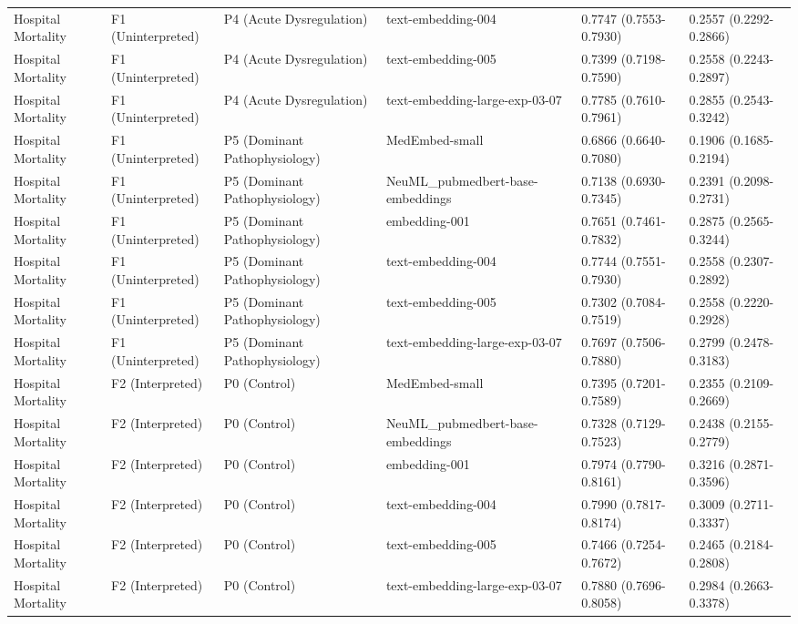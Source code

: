 \documentclass[border=0pt]{standalone}
\begin{document}
\begin{adjustbox}{width=\textwidth}
\begin{tabular}{llllll}
Hospital Mortality & F1 (Uninterpreted) & P4 (Acute Dysregulation) & text-embedding-004 & 0.7747 (0.7553-0.7930) & 0.2557 (0.2292-0.2866) \\
Hospital Mortality & F1 (Uninterpreted) & P4 (Acute Dysregulation) & text-embedding-005 & 0.7399 (0.7198-0.7590) & 0.2558 (0.2243-0.2897) \\
Hospital Mortality & F1 (Uninterpreted) & P4 (Acute Dysregulation) & text-embedding-large-exp-03-07 & 0.7785 (0.7610-0.7961) & 0.2855 (0.2543-0.3242) \\
Hospital Mortality & F1 (Uninterpreted) & P5 (Dominant Pathophysiology) & MedEmbed-small & 0.6866 (0.6640-0.7080) & 0.1906 (0.1685-0.2194) \\
Hospital Mortality & F1 (Uninterpreted) & P5 (Dominant Pathophysiology) & NeuML\_pubmedbert-base-embeddings & 0.7138 (0.6930-0.7345) & 0.2391 (0.2098-0.2731) \\
Hospital Mortality & F1 (Uninterpreted) & P5 (Dominant Pathophysiology) & embedding-001 & 0.7651 (0.7461-0.7832) & 0.2875 (0.2565-0.3244) \\
Hospital Mortality & F1 (Uninterpreted) & P5 (Dominant Pathophysiology) & text-embedding-004 & 0.7744 (0.7551-0.7930) & 0.2558 (0.2307-0.2892) \\
Hospital Mortality & F1 (Uninterpreted) & P5 (Dominant Pathophysiology) & text-embedding-005 & 0.7302 (0.7084-0.7519) & 0.2558 (0.2220-0.2928) \\
Hospital Mortality & F1 (Uninterpreted) & P5 (Dominant Pathophysiology) & text-embedding-large-exp-03-07 & 0.7697 (0.7506-0.7880) & 0.2799 (0.2478-0.3183) \\
Hospital Mortality & F2 (Interpreted) & P0 (Control) & MedEmbed-small & 0.7395 (0.7201-0.7589) & 0.2355 (0.2109-0.2669) \\
Hospital Mortality & F2 (Interpreted) & P0 (Control) & NeuML\_pubmedbert-base-embeddings & 0.7328 (0.7129-0.7523) & 0.2438 (0.2155-0.2779) \\
Hospital Mortality & F2 (Interpreted) & P0 (Control) & embedding-001 & 0.7974 (0.7790-0.8161) & 0.3216 (0.2871-0.3596) \\
Hospital Mortality & F2 (Interpreted) & P0 (Control) & text-embedding-004 & 0.7990 (0.7817-0.8174) & 0.3009 (0.2711-0.3337) \\
Hospital Mortality & F2 (Interpreted) & P0 (Control) & text-embedding-005 & 0.7466 (0.7254-0.7672) & 0.2465 (0.2184-0.2808) \\
Hospital Mortality & F2 (Interpreted) & P0 (Control) & text-embedding-large-exp-03-07 & 0.7880 (0.7696-0.8058) & 0.2984 (0.2663-0.3378) \\

\end{tabular}
\end{adjustbox}
\end{document}
